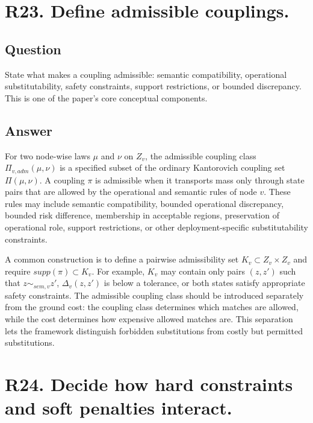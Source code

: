 \documentclass[11pt,a4paper]{article}
\begin{document}
\section*{R23. Define admissible couplings.}

\subsection*{Question}

State what makes a coupling admissible: semantic compatibility, operational substitutability, safety constraints, support restrictions, or bounded discrepancy. This is one of the paper's core conceptual components.

\subsection*{Answer}

For two node-wise laws \(\mu\) and \(\nu\) on \(Z_v\), the admissible coupling class \(\Pi_{v,adm}(\mu,\nu)\) is a specified subset of the ordinary Kantorovich coupling set \(\Pi(\mu,\nu)\). A coupling \(\pi\) is admissible when it transports mass only through state pairs that are allowed by the operational and semantic rules of node \(v\). These rules may include semantic compatibility, bounded operational discrepancy, bounded risk difference, membership in acceptable regions, preservation of operational role, support restrictions, or other deployment-specific substitutability constraints.

A common construction is to define a pairwise admissibility set \(K_v \subset Z_v \times Z_v\) and require \(supp(\pi) \subset K_v\). For example, \(K_v\) may contain only pairs \((z,z')\) such that \(z \sim_{sem,v} z'\), \(\Delta_v(z,z')\) is below a tolerance, or both states satisfy appropriate safety constraints. The admissible coupling class should be introduced separately from the ground cost: the coupling class determines which matches are allowed, while the cost determines how expensive allowed matches are. This separation lets the framework distinguish forbidden substitutions from costly but permitted substitutions.

\section*{R24. Decide how hard constraints and soft penalties interact.}
\end{document}
